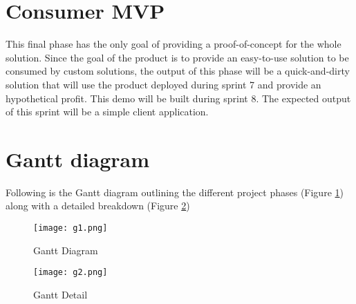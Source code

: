 \section{Consumer MVP}
This final phase has the only goal of providing a proof-of-concept for the whole solution. Since the goal of the product is to provide an easy-to-use solution to be consumed by custom solutions, the output of this phase will be a quick-and-dirty solution that will use the product deployed during sprint 7 and provide an hypothetical profit. This demo will be built during sprint 8. The expected output of this sprint will be a simple client application.

\section{Gantt diagram}
Following is the Gantt diagram outlining the different project phases (Figure \ref{fig:ganttdiagram}) along with a detailed breakdown (Figure \ref{fig:ganttdetail})

\begin{figure}
	\centering
		\texttt{[image: g1.png]}
	\caption{Gantt Diagram}
	\label{fig:ganttdiagram}
\end{figure}

\begin{figure}
	\centering
		\texttt{[image: g2.png]}
	\caption{Gantt Detail}
	\label{fig:ganttdetail}
\end{figure}
